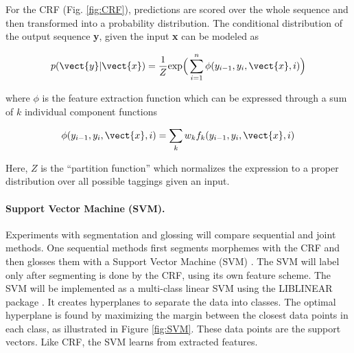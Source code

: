 
For the CRF (Fig. \ref{fig:CRF}), predictions are scored over the whole sequence and then transformed into a probability distribution. The conditional distribution of the output sequence {\bf y}, given the input {\bf x} can be modeled as

\begin{equation}
p(\vect{y}|\vect{x}) = \frac{1}{Z} \textrm{exp}\Big(\sum_{i=1}^n\phi(y_{i-1}, y_i,\vect{x},i)\Big)
\end{equation}

\noindent where $\phi$ is the feature extraction function which can be expressed through a sum of $k$ individual component functions

\begin{equation}
\phi(y_{i-1}, y_i,\vect{x},i) = \sum_k w_k f_k(y_{i-1}, y_i,\vect{x},i)
\end{equation}

\noindent Here, $Z$ is the ``partition function'' which normalizes the expression to a proper distribution over all possible taggings given an input. 

\paragraph{Support Vector Machine (SVM).} Experiments with segmentation and glossing will compare sequential and joint methods. One sequential methods first segments morphemes with the CRF and then glosses them with a Support Vector Machine (SVM) \citep{svm_cortes}. The SVM will label only after segmenting is done by the CRF, using its own feature scheme. The SVM will be implemented as a multi-class linear SVM using the LIBLINEAR package \citep{fan2008}. It creates hyperplanes to separate the data into classes. The optimal hyperplane is found by maximizing the margin between the closest data points in each class, as illustrated in Figure \ref{fig:SVM}. These data points are the support vectors. Like CRF, the SVM learns from extracted features.

